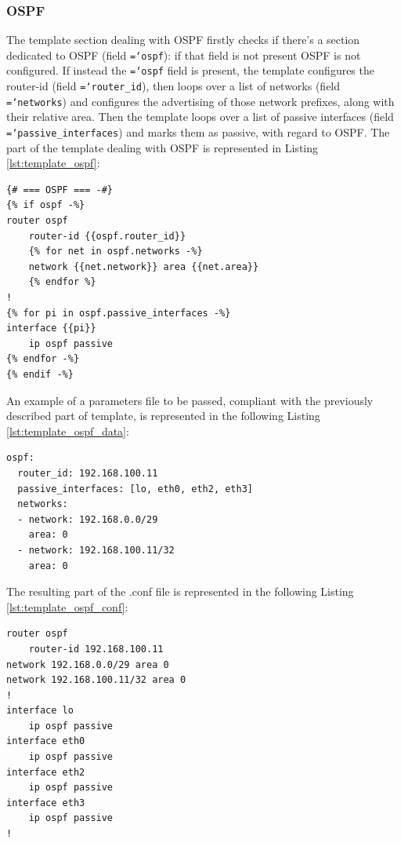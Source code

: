 \documentclass{report}
\newcommand{\monospaced}[1]{\texttt{\hyphenchar\font=`\-#1}}
\begin{document}
\subsubsection{OSPF}\label{sec:template_frr_ospf}
The template section dealing with OSPF firstly checks if there's a section dedicated to OSPF (field \monospaced{ospf}): if that field is not present OSPF is not configured.\newline
If instead the \monospaced{ospf} field is present, the template configures the router-id (field \monospaced{router\_id}), then loops over a list of networks (field \monospaced{networks}) and configures the advertising of those network prefixes, along with their relative area.\newline
Then the template loops over a list of passive interfaces (field \monospaced{passive\_interfaces}) and marks them as passive, with regard to OSPF.
The part of the template dealing with OSPF is represented in Listing \ref{lst:template_ospf}:
\begin{lstlisting}[style=styleJinja, caption=FRR template - OSPF, label=lst:template_ospf]
{# === OSPF === -#}
{% if ospf -%}
router ospf
    router-id {{ospf.router_id}}
    {% for net in ospf.networks -%}
    network {{net.network}} area {{net.area}}
    {% endfor %}
!
{% for pi in ospf.passive_interfaces -%}
interface {{pi}}
    ip ospf passive
{% endfor -%}
{% endif -%}
\end{lstlisting}
An example of a parameters file to be passed, compliant with the previously described part of template, is represented in the following Listing \ref{lst:template_ospf_data}:
\begin{lstlisting}[style=styleYml, caption=OSPF parameters, label=lst:template_ospf_data,
    morekeywords={ospf, pid, router_id, passive_interfaces, networks, network, area}]
ospf:
  router_id: 192.168.100.11
  passive_interfaces: [lo, eth0, eth2, eth3]
  networks:
  - network: 192.168.0.0/29
    area: 0
  - network: 192.168.100.11/32
    area: 0
\end{lstlisting}
The resulting part of the .conf file is represented in the following Listing \ref{lst:template_ospf_conf}:
\begin{lstlisting}[style=styleConf, caption=OSPF Configuration example, label=lst:template_ospf_conf]
router ospf
    router-id 192.168.100.11
network 192.168.0.0/29 area 0
network 192.168.100.11/32 area 0
!
interface lo
    ip ospf passive
interface eth0
    ip ospf passive
interface eth2
    ip ospf passive
interface eth3
    ip ospf passive
!
\end{lstlisting}
\end{document}
